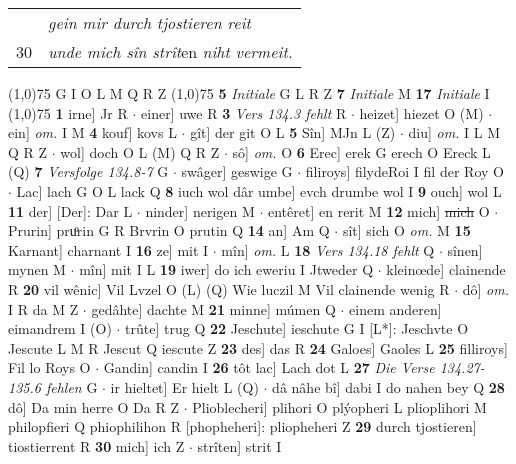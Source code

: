 \documentclass[8pt,a4paper,notitlepage]{article}
\begin{document}
\begin{table}[ht]
\begin{minipage}[t]{0.5\linewidth}
\begin{tabular}{rl}
 & \textit{gein mir durch tjostieren reit}\\ 
30 & \textit{unde mich sîn strît}en \textit{niht vermeit.}\\ 
\end{tabular}
\scriptsize
\line(1,0){75} \newline
G I O L M Q R Z \newline
\line(1,0){75} \newline
\textbf{5} \textit{Initiale} G L R Z  \textbf{7} \textit{Initiale} M  \textbf{17} \textit{Initiale} I  \newline
\line(1,0){75} \newline
\textbf{1} irne] Jr R  $\cdot$ einer] uwe R \textbf{3} \textit{Vers 134.3 fehlt} R   $\cdot$ heizet] hiezet O (M)  $\cdot$ ein] \textit{om.} I M \textbf{4} kouf] kovs L  $\cdot$ gît] der git O L \textbf{5} Sîn] MJn L (Z)  $\cdot$ diu] \textit{om.} I L M Q R Z  $\cdot$ wol] doch O L (M) Q R Z  $\cdot$ sô] \textit{om.} O \textbf{6} Erec] erek G erech O Ereck L (Q) \textbf{7} \textit{Versfolge 134.8-7} G   $\cdot$ swâger] geswige G  $\cdot$ filiroys] filydeRoi I fil der Roy O  $\cdot$ Lac] lach G O L lack Q \textbf{8} iuch wol dâr umbe] evch drumbe wol I \textbf{9} ouch] wol L \textbf{11} der] [Der]: Dar L  $\cdot$ ninder] nerigen M  $\cdot$ entêret] en rerit M \textbf{12} mich] \sout{mich} O  $\cdot$ Prurin] pruͦrin G R Brvrin O prutin Q \textbf{14} an] Am Q  $\cdot$ sît] sich O \textit{om.} M \textbf{15} Karnant] charnant I \textbf{16} ze] mit I  $\cdot$ mîn] \textit{om.} L \textbf{18} \textit{Vers 134.18 fehlt} Q   $\cdot$ sînen] mynen M  $\cdot$ mîn] mit I L \textbf{19} iwer] do ich eweriu I Jtweder Q  $\cdot$ kleinœde] clainende R \textbf{20} vil wênic] Vil Lvzel O (L) (Q) Wie luczil M Vil clainende wenig R  $\cdot$ dô] \textit{om.} I R da M Z  $\cdot$ gedâhte] dachte M \textbf{21} minne] múmen Q  $\cdot$ einem anderen] eimandrem I (O)  $\cdot$ trûte] trug Q \textbf{22} Jeschute] ieschute G I [L*]: Jeschvte O Jescute L M R Jescut Q iescute Z \textbf{23} des] das R \textbf{24} Galoes] Gaoles L \textbf{25} filliroys] Fil lo Roys O  $\cdot$ Gandin] candin I \textbf{26} tôt lac] Lach dot L \textbf{27} \textit{Die Verse 134.27-135.6 fehlen} G   $\cdot$ ir hieltet] Er hielt L (Q)  $\cdot$ dâ nâhe bî] dabi I do nahen bey Q \textbf{28} dô] Da min herre O Da R Z  $\cdot$ Plioblecheri] plihori O plýopheri L plioplihori M philopfieri Q phiophilihon R [phopheheri]: pliopheheri Z \textbf{29} durch tjostieren] tiostierrent R \textbf{30} mich] ich Z  $\cdot$ strîten] strit I \newline

\end{minipage}
\end{table}
\end{document}
